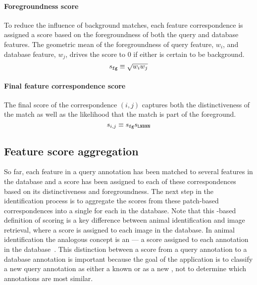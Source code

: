         \paragraph{Foregroundness score}
            To reduce the influence of background matches, each feature correspondence is assigned a score based on
            the foregroundness of both the query and database features. The geometric mean of the foregroundness of
            query feature, $w_i$, and database feature, $w_j$, drives the score to $0$ if either is certain to be
            background. %
            \begin{equation}
                s_{{\tt fg}} \equiv \sqrt{w_i w_j}
            \end{equation}

        \paragraph{Final feature correspondence score}
            The final score of the correspondence $(i, j)$ captures both the distinctiveness of the match as well
            as the likelihood that the match is part of the foreground.
              \begin{equation}\label{eqn:featscore}
                  s_{i,j} \equiv s_{{\tt fg}} s_{\tt{LNBNN}} 
              \end{equation}

    \subsection{Feature score aggregation}\label{subsec:namescore}

        So far, each feature in a query annotation has been matched to several features in the database and a score
        has been assigned to each of these correspondences based on its distinctiveness and foregroundness. The
        next step in the identification process is to aggregate the scores from these patch-based correspondences
        into a single \glossterm{\namescore} for each \name{} in the database. Note that this \name-based
        definition of scoring is a key difference between animal identification and image retrieval, where a score
        is assigned to each image in the database. In animal identification the analogous concept is an
        \glossterm{\annotscore} --- a score assigned to each annotation in the database~\cite{philbin_object_2007}.
        This distinction between a score from a query annotation to a database annotation is important because the
        goal of the application is to classify a new query annotation as either a known \name{} or as a new
        \name{}, not to determine which annotations are most similar.

